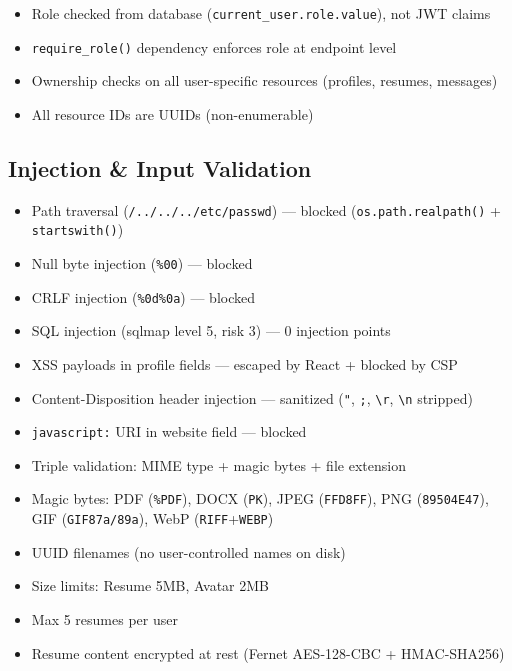 \documentclass[11pt,a4paper]{article}
\begin{document}
\begin{tcolorbox}[colback=pass!5, colframe=pass, title=\textbf{Role-Based Access Control --- PASS}]
\begin{itemize}[nosep]
  \item Role checked from database (\texttt{current\_user.role.value}), not JWT claims
  \item \texttt{require\_role()} dependency enforces role at endpoint level
  \item Ownership checks on all user-specific resources (profiles, resumes, messages)
  \item All resource IDs are UUIDs (non-enumerable)
\end{itemize}
\end{tcolorbox}

\subsection{Injection \& Input Validation}

\begin{tcolorbox}[colback=pass!5, colframe=pass, title=\textbf{Injection Attacks --- PASS}]
\begin{itemize}[nosep]
  \item Path traversal (\texttt{/../../../etc/passwd}) --- blocked (\texttt{os.path.realpath()} + \texttt{startswith()})
  \item Null byte injection (\texttt{\%00}) --- blocked
  \item CRLF injection (\texttt{\%0d\%0a}) --- blocked
  \item SQL injection (sqlmap level 5, risk 3) --- 0 injection points
  \item XSS payloads in profile fields --- escaped by React + blocked by CSP
  \item Content-Disposition header injection --- sanitized (\texttt{"}, \texttt{;}, \texttt{\textbackslash r}, \texttt{\textbackslash n} stripped)
  \item \texttt{javascript:} URI in website field --- blocked
\end{itemize}
\end{tcolorbox}

\begin{tcolorbox}[colback=pass!5, colframe=pass, title=\textbf{File Upload --- PASS}]
\begin{itemize}[nosep]
  \item Triple validation: MIME type + magic bytes + file extension
  \item Magic bytes: PDF (\texttt{\%PDF}), DOCX (\texttt{PK}), JPEG (\texttt{FFD8FF}), PNG (\texttt{89504E47}), GIF (\texttt{GIF87a/89a}), WebP (\texttt{RIFF}+\texttt{WEBP})
  \item UUID filenames (no user-controlled names on disk)
  \item Size limits: Resume 5MB, Avatar 2MB
  \item Max 5 resumes per user
  \item Resume content encrypted at rest (Fernet AES-128-CBC + HMAC-SHA256)
\end{itemize}
\end{tcolorbox}
\end{document}

